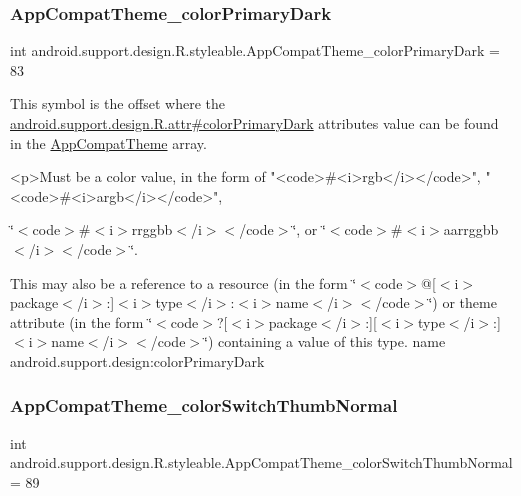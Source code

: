 \subsubsection{\texorpdfstring{App\+Compat\+Theme\+\_\+color\+Primary\+Dark}{AppCompatTheme\_colorPrimaryDark}}
{\footnotesize\ttfamily int android.\+support.\+design.\+R.\+styleable.\+App\+Compat\+Theme\+\_\+color\+Primary\+Dark = 83\hspace{0.3cm}{\ttfamily [static]}}

This symbol is the offset where the \hyperlink{classandroid_1_1support_1_1design_1_1R_1_1attr_a1014705e54c4e0b7ae9a29b8116f1124}{android.\+support.\+design.\+R.\+attr\#color\+Primary\+Dark} attribute\textquotesingle{}s value can be found in the \hyperlink{classandroid_1_1support_1_1design_1_1R_1_1styleable_afb351dc8de20cbd4c89abe360373010c}{App\+Compat\+Theme} array.

\begin{DoxyVerb}      <p>Must be a color value, in the form of "<code>#<i>rgb</i></code>", "<code>#<i>argb</i></code>",
\end{DoxyVerb}
 \char`\"{}$<$code$>$\#$<$i$>$rrggbb$<$/i$>$$<$/code$>$\char`\"{}, or \char`\"{}$<$code$>$\#$<$i$>$aarrggbb$<$/i$>$$<$/code$>$\char`\"{}. 

This may also be a reference to a resource (in the form \char`\"{}$<$code$>$@\mbox{[}$<$i$>$package$<$/i$>$\+:\mbox{]}$<$i$>$type$<$/i$>$\+:$<$i$>$name$<$/i$>$$<$/code$>$\char`\"{}) or theme attribute (in the form \char`\"{}$<$code$>$?\mbox{[}$<$i$>$package$<$/i$>$\+:\mbox{]}\mbox{[}$<$i$>$type$<$/i$>$\+:\mbox{]}$<$i$>$name$<$/i$>$$<$/code$>$\char`\"{}) containing a value of this type.  name android.\+support.\+design\+:color\+Primary\+Dark \mbox{\label{classandroid_1_1support_1_1design_1_1R_1_1styleable_a70a2af057154b1ea10f13cd045700a22}} 
\subsubsection{\texorpdfstring{App\+Compat\+Theme\+\_\+color\+Switch\+Thumb\+Normal}{AppCompatTheme\_colorSwitchThumbNormal}}
{\footnotesize\ttfamily int android.\+support.\+design.\+R.\+styleable.\+App\+Compat\+Theme\+\_\+color\+Switch\+Thumb\+Normal = 89\hspace{0.3cm}{\ttfamily [static]}}

